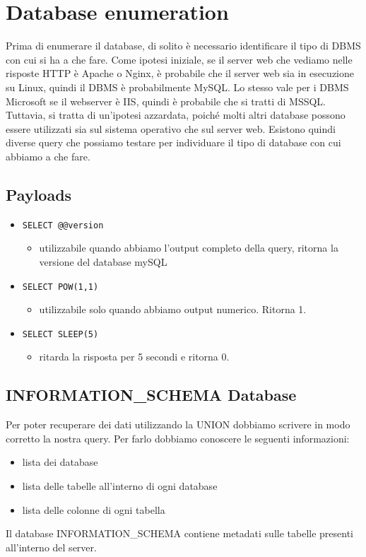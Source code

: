 \documentclass[oneside,a4paper,11pt]{book}
\theoremstyle{italicstyle}
\theoremstyle{normStyle}
\begin{document}
\section{Database enumeration}
Prima di enumerare il database, di solito è necessario identificare il tipo di DBMS con cui si ha a che fare. 
Come ipotesi iniziale, se il server web che vediamo nelle risposte HTTP è Apache o Nginx, è probabile che il server web sia in esecuzione su Linux, quindi il DBMS è probabilmente MySQL. Lo stesso vale per i DBMS Microsoft se il webserver è IIS, quindi è probabile che si tratti di MSSQL. Tuttavia, si tratta di un'ipotesi azzardata, poiché molti altri database possono essere utilizzati sia sul sistema operativo che sul server web. Esistono quindi diverse query che possiamo testare per individuare il tipo di database con cui abbiamo a che fare.

\subsection{Payloads}
\begin{itemize}
    \item \begin{verbatim}SELECT @@version\end{verbatim}
    \begin{itemize}
        \item utilizzabile quando abbiamo l'output completo della query, ritorna la versione del database mySQL
    \end{itemize}
    \item \begin{verbatim}SELECT POW(1,1)\end{verbatim}
    \begin{itemize}
        \item utilizzabile solo quando abbiamo output numerico. Ritorna 1.
    \end{itemize}
    \item \begin{verbatim}SELECT SLEEP(5)\end{verbatim}
    \begin{itemize}
        \item ritarda la risposta per 5 secondi e ritorna 0.
    \end{itemize}
\end{itemize}

\subsection{INFORMATION\_SCHEMA Database}
Per poter recuperare dei dati utilizzando la UNION dobbiamo scrivere in modo corretto la nostra query. Per farlo dobbiamo conoscere le seguenti informazioni:
\begin{itemize}
    \item lista dei database
    \item lista delle tabelle all'interno di ogni database
    \item lista delle colonne di ogni tabella
\end{itemize}
Il database INFORMATION\_SCHEMA contiene metadati sulle tabelle presenti all'interno del server.
\end{document}
